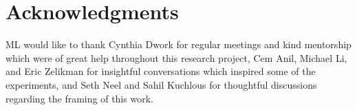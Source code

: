 \section*{Acknowledgments}

ML would like to thank Cynthia Dwork for regular meetings and kind mentorship which were of great help throughout this research project, Cem Anil, Michael Li, and Eric Zelikman for insightful conversations which inspired some of the experiments, and Seth Neel and Sahil Kuchlous for thoughtful discussions regarding the framing of this work. 
